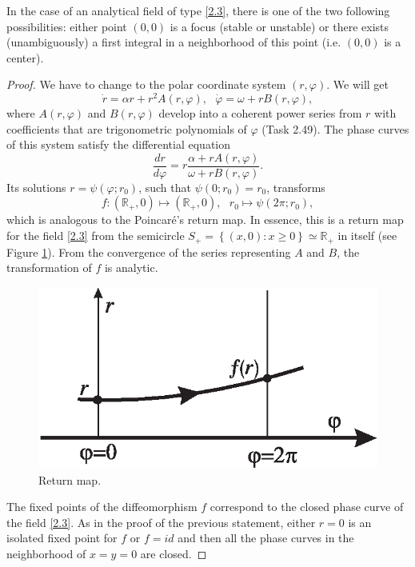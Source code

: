 \begin{proposition}\label{prop:2.11}
	In the case of an analytical field of type \eqref{2.3}, there is one of the two following possibilities: either point $ \left (0,0 \right) $ is a focus (stable or unstable) or there exists (unambiguously) a first integral in a neighborhood of this point (i.e. $ \left (0, 0 \right) $ is a center).
	\begin{proof}
		We have to change to the polar coordinate system $ \left (r, \varphi \right) $. We will get
		\begin{equation}
		\label{2.4}
		\dot{r}=\alpha r+r^{2}A(r,\varphi ),\text{ \ }\dot{\varphi}=\omega
		+rB(r,\varphi ),
		\end{equation}
		where $A(r,\varphi )$ and $B(r,\varphi )$ develop into a coherent power series from $r$ with coefficients that are trigonometric polynomials of $ \varphi $ (Task 2.49). The phase curves of this system satisfy the differential equation
		\begin{equation}
		\label{2.5}
		\frac{dr}{d\varphi }=r\frac{\alpha +rA(r,\varphi )}{\omega +rB(r,\varphi )}.
		\end{equation}
		Its solutions $r=\psi (\varphi ;r_{0})$, such that $\psi
		(0;r_{0})=r_{0}$, transforms
		$$
		f:\left( \mathbb{R}_{+},0\right) \longmapsto \left( \mathbb{R}_{+},0\right) ,%
		\text{ \ \ }r_{0}\longmapsto \psi (2\pi ;r_{0}),
		$$
		which is analogous to the Poincaré's return map. In essence, this is a return map for the field \eqref{2.3} from the semicircle $ S _+ = \left \{\left(x, 0 \right): x \geq 0 \right \} \simeq \mathbb {R} _ {+}$ in itself (see Figure \ref{fig:2.5}). From the convergence of the series representing $ A $ and $ B $, the transformation of $ f $ is analytic.
	\begin{figure}[!ht]
		\centering
		\includegraphics [scale=1]{jtr25}
		\caption{Return map.}
		\label{fig:2.5}
	\end{figure}
		The fixed points of the diffeomorphism $ f $ correspond to the closed  phase curve of the field \eqref{2.3}. As in the proof of the previous statement, either $ r = 0 $ is an isolated fixed point for $ f $ or $ f = id $ and then all the phase curves in the neighborhood of $ x = y = 0 $ are closed.
	\end{proof}
\end{proposition}

